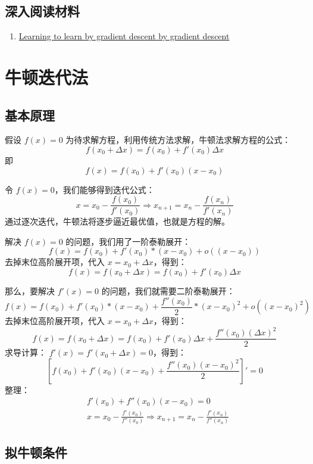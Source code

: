 \subsection{深入阅读材料}
\begin{enumerate}
    \item \href{https://arxiv.org/abs/1606.04474}{Learning to learn by gradient descent by gradient descent}



\end{enumerate}






\section{牛顿迭代法}
\subsection{基本原理}
假设 $f(x) = 0$ 为待求解方程，利用传统方法求解，牛顿法求解方程的公式：
\[
f(x_0 + \Delta x) = f(x_0) + f'(x_0)\Delta x
\]
即
\[
    f(x) = f(x_0) + f'(x_0)(x - x_0)
\]

令 $f(x) = 0$，我们能够得到迭代公式：
\[
    x = x_0 - \frac{f(x_0)}{f'(x_0)} \Rightarrow x_{n+1} = x_n - \frac{f(x_n)}{f'(x_n)}
\]
通过逐次迭代，牛顿法将逐步逼近最优值，也就是方程的解。

解决 $f(x) = 0$ 的问题，我们用了一阶泰勒展开：
\[
    f(x) = f(x_0) + f'(x_0)*(x-x_0) + o((x-x_0))
\]
去掉末位高阶展开项，代入 $x = x_0 + \Delta x$，得到：
\[
    f(x) = f(x_0 + \Delta x) = f(x_0) + f'(x_0)\Delta x
\]


那么，要解决 $f'(x) = 0$ 的问题，我们就需要二阶泰勒展开：
\[
    f(x) = f(x_0) + f'(x_0)*(x-x_0) + \frac{f''(x_0)}{2}*(x-x_0)^2 + o((x-x_0)^2)
\]
去掉末位高阶展开项，代入 $x = x_0+\Delta x$，得到：
\[
    f(x) = f(x_0+\Delta x) = f(x_0) + f'(x_0) \Delta x + \frac{f''(x_0) (\Delta x)^2}{2}
\]
求导计算： $f'(x) = f'(x_0+\Delta x) = 0$，得到：
\[
    [f(x_0) + f'(x_0)(x−x_0) + \frac{f''(x_0)(x−x_0)^2}{2}]′ = 0
\]
整理：
\begin{align*}
    & f'(x_0) + f''(x_0)(x−x_0) = 0 \\
    & x = x_0 − \frac{f'(x_0)}{f''(x_0)} \Rightarrow  x_{n+1} = x_n - \frac{f'(x_n)}{f''(x_n)}
\end{align*}

\subsection{拟牛顿条件}

